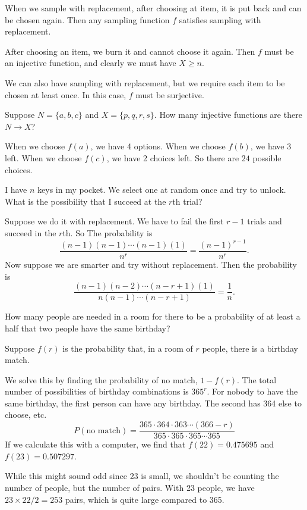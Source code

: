 \documentclass[a4paper]{article}
\begin{document}
\begin{defi}
  When we sample with replacement, after choosing at item, it is put back and can be chosen again. Then any sampling function $f$ satisfies sampling with replacement.
\end{defi}

\begin{defi}
  After choosing an item, we burn it and cannot choose it again. Then $f$ must be an injective function, and clearly we must have $X \geq n$.
\end{defi}

We can also have sampling with replacement, but we require each item to be chosen at least once. In this case, $f$ must be surjective.

\begin{eg}
  Suppose $N = \{a, b, c\}$ and $X = \{p, q, r, s\}$. How many injective functions are there $N\to X$?

  When we choose $f(a)$, we have 4 options. When we choose $f(b)$, we have 3 left. When we choose $f(c)$, we have 2 choices left. So there are $24$ possible choices.
\end{eg}

\begin{eg}
  I have $n$ keys in my pocket. We select one at random once and try to unlock. What is the possibility that I succeed at the $r$th trial?

  Suppose we do it with replacement. We have to fail the first $r - 1$ trials and succeed in the $r$th. So The probability is
  \[
    \frac{(n - 1)(n - 1) \cdots (n - 1)(1)}{n^r} = \frac{(n - 1)^{r - 1}}{n^r}.
  \]
  Now suppose we are smarter and try without replacement. Then the probability is
  \[
    \frac{(n - 1)(n - 2)\cdots (n - r + 1)(1)}{n(n - 1) \cdots (n - r + 1)} = \frac{1}{n}.
  \]
\end{eg}
\begin{eg}
  How many people are needed in a room for there to be a probability of at least a half that two people have the same birthday?

  Suppose $f(r)$ is the probability that, in a room of $r$ people, there is a birthday match.

  We solve this by finding the probability of no match, $1 - f(r)$. The total number of possibilities of birthday combinations is $365^r$. For nobody to have the same birthday, the first person can have any birthday. The second has 364 else to choose, etc.
  \[
    P(\text{no match}) = \frac{365\cdot 364\cdot 363 \cdots (366 - r)}{365\cdot 365\cdot 365 \cdots 365}
  \]
  If we calculate this with a computer, we find that $f(22) = 0.475695$ and $f(23) = 0.507297$.

  While this might sound odd since 23 is small, we shouldn't be counting the number of people, but the number of pairs. With 23 people, we have $23\times 22/2 = 253$ pairs, which is quite large compared to 365.
\end{eg}
\end{document}
